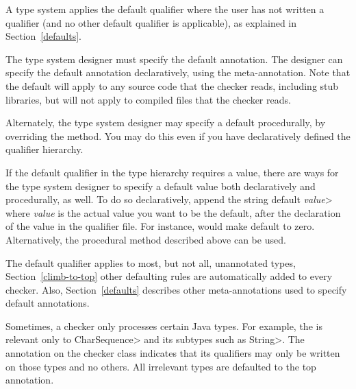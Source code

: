 
A type system applies the default qualifier where the user has not written a
qualifier (and no other default qualifier is applicable), as explained in
Section~\ref{defaults}.

The type system designer must specify the default annotation. The designer can specify the default annotation declaratively,
using the 
meta-annotation.
Note that the default will apply to any source code that the checker reads,
including stub libraries, but will not apply to compiled 
files that the checker reads.

\begin{sloppypar}
Alternately, the type system designer may specify a default procedurally,
by overriding the
method.  You may do this even if you have declaratively defined the
qualifier hierarchy.
\end{sloppypar}

If the default qualifier in the type hierarchy requires a value, there are
ways for the type system designer to specify a default value both
declaratively and procedurally, as well.  To do so declaratively, append
the string \<default \emph{value}> where \emph{value} is the actual value
you want to be the default, after the declaration of the value in the
qualifier file.  For instance,  would make
 default to zero. Alternatively, the procedural method
described above can be used.

The default qualifier applies to most, but not all, unannotated types, Section~\ref{climb-to-top}
other defaulting rules are automatically added to every checker. Also, Section~\ref{defaults}
describes other meta-annotations used to specify default annotations.


Sometimes, a checker only processes certain Java types.  For example, the
 is relevant only to
\<CharSequence> and its subtypes such as \<String>.
The 
annotation on the checker class indicates that its qualifiers may only be
written on those types and no others.  All irrelevant types are defaulted to
the top annotation.


